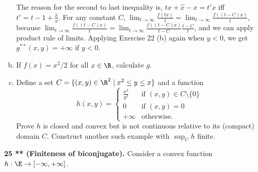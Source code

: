\documentclass[../borwein-lewis_notes.tex]{subfiles}
\begin{document}
\begin{enumerate}[(a)]
{\begin{equation*}
\end{equation*}
The reason for the second to last inequality is, $tx+\hat x-x
= t'x$ iff $t' = t-1+\frac{\hat x}{x}$. For any constant $C$, 
$\lim_{t\to\infty} \frac{f(tx)}{t} = \lim_{t\to\infty}
 \frac{f((t-C)x)}{t}$, because $\lim_{t\to\infty}\frac{f((t-C)x)}{t}
= \lim_{t\to\infty}\frac{f((t-C)x)}{t-C}\frac{t-C}{t}$, and we can 
apply product rule of limits. Applying Exercise 22 (b) again when $y<0$, 
we get $g^{**}(x,y) = +\infty$ if $y<0$.
}
\item If $f(x)=x^2/2$ for all $x\in\R$, calculate $g$.  \\
\item Define a set $C=\{(x,y)\in\R^2\mid x^2\leq y\leq x\}$ and a function
\begin{equation*}
h(x,y) = \begin{cases} \frac{x^3}{y^2} & \text{if }(x,y)\in C\setminus
\{0\} \\ 0 & \text{if }(x,y)=0 \\ +\infty &\text{otherwise.}
\end{cases}
\end{equation*}
Prove $h$ is closed and convex but is not continuous relative to its 
(compact) domain $C$. Construct another such example with $\sup_C h$ 
finite.\\
\end{enumerate}
\noindent
\textbf{25 ** (Finiteness of biconjugate).} Consider a convex function 
$h:\E\to[-\infty,+\infty]$. 
\end{document}
